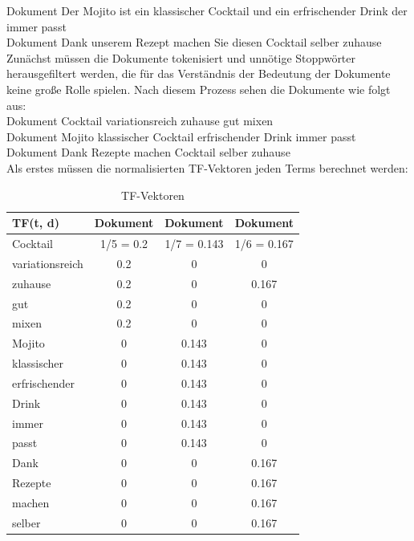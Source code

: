 Dokument  \glqq Der Mojito ist ein klassischer Cocktail und ein erfrischender Drink der 
immer passt\grqq{}\\
Dokument  \glqq Dank unserem Rezept machen Sie diesen Cocktail selber zuhause\grqq{}\\
Zunächst müssen die Dokumente tokenisiert und unnötige Stoppwörter herausgefiltert werden, die für das Verständnis der Bedeutung der Dokumente keine große Rolle spielen. 
Nach diesem Prozess sehen die Dokumente wie folgt aus:\\
Dokument  \glqq Cocktail variationsreich zuhause gut mixen\grqq{}\\
Dokument  \glqq Mojito klassischer Cocktail erfrischender Drink immer passt\grqq{}\\
Dokument  \glqq Dank Rezepte machen Cocktail selber zuhause\grqq{}\\
Als erstes müssen die normalisierten \ac{TF}-Vektoren jeden Terms berechnet werden:
\begin{table}[H]
    \centering
    \begin{tabular}{l|c|c|c}
        TF(t, d)          & Dokument \textnumero 1 & Dokument \textnumero 2 & Dokument \textnumero 3 \\
        \hline
        Cocktail            & 1/5 = 0.2             & 1/7 = 0.143      & 1/6 = 0.167 \\
        \hline
        variationsreich & 0.2             & 0 & 0      \\
        \hline
        zuhause                & 0.2           & 0    & 0.167 \\
        \hline
        gut                  & 0.2             & 0      & 0  \\
        \hline
        mixen            & 0.2             & 0      & 0 \\
        \hline
        Mojito & 0             & 0.143 & 0      \\
        \hline
        klassischer                & 0           & 0.143    & 0 \\
        \hline
        erfrischender                  & 0             & 0.143      & 0   \\
        \hline
        Drink            & 0             & 0.143      & 0 \\
        \hline
        immer & 0             & 0.143 & 0      \\
        \hline
        passt                & 0          & 0.143    & 0 \\
        \hline
        Dank                  & 0             & 0      & 0.167   \\
        \hline
        Rezepte            & 0             & 0      & 0.167 \\
        \hline
        machen & 0             & 0 & 0.167      \\
        \hline
        selber                & 0           & 0    & 0.167\\
    \end{tabular}
    \caption{\label{table:TF_Vektoren}\ac{TF}-Vektoren}
\end{table}
